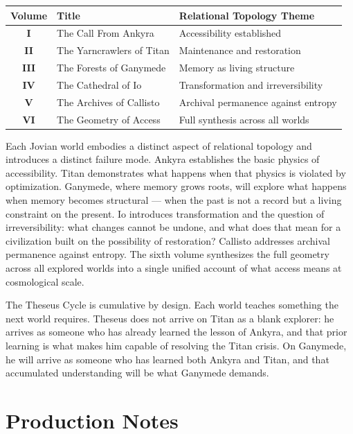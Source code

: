 \documentclass[11pt]{article}
\begin{document}
\begin{center}
\begin{tabular}{>{\bfseries}c l l}
\toprule
Volume & Title & Relational Topology Theme \\
\midrule
I & The Call From Ankyra & Accessibility established \\
II & The Yarncrawlers of Titan & Maintenance and restoration \\
III & The Forests of Ganymede & Memory as living structure \\
IV & The Cathedral of Io & Transformation and irreversibility \\
V & The Archives of Callisto & Archival permanence against entropy \\
VI & The Geometry of Access & Full synthesis across all worlds \\
\bottomrule
\end{tabular}
\end{center}

Each Jovian world embodies a distinct aspect of relational topology and introduces a distinct failure mode. Ankyra establishes the basic physics of accessibility. Titan demonstrates what happens when that physics is violated by optimization. Ganymede, where memory grows roots, will explore what happens when memory becomes structural --- when the past is not a record but a living constraint on the present. Io introduces transformation and the question of irreversibility: what changes cannot be undone, and what does that mean for a civilization built on the possibility of restoration? Callisto addresses archival permanence against entropy. The sixth volume synthesizes the full geometry across all explored worlds into a single unified account of what access means at cosmological scale.

The Theseus Cycle is cumulative by design. Each world teaches something the next world requires. Theseus does not arrive on Titan as a blank explorer: he arrives as someone who has already learned the lesson of Ankyra, and that prior learning is what makes him capable of resolving the Titan crisis. On Ganymede, he will arrive as someone who has learned both Ankyra and Titan, and that accumulated understanding will be what Ganymede demands.

\section{Production Notes}
\end{document}
